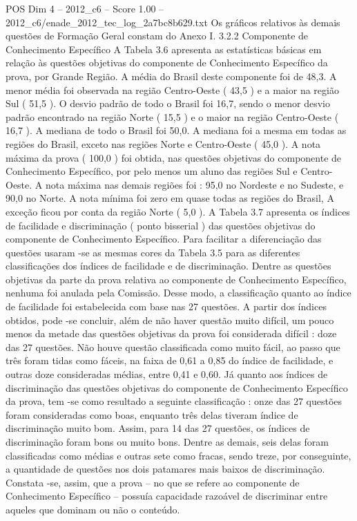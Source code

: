 \begin{textsample}{POS Dim 4 – 2012\_c6 – Score 1.00 – 2012\_c6/enade\_2012\_tec\_log\_2a7bc8b629.txt}
Os gráficos relativos às demais questões de Formação Geral constam do Anexo I. 3.2.2 Componente de Conhecimento Específico A Tabela 3.6 apresenta as estatísticas básicas em relação às questões objetivas do componente de Conhecimento Específico da prova, por Grande Região.
A média do Brasil deste componente foi de 48,3.
A menor média foi observada na região Centro-Oeste ( 43,5 ) e a maior na região Sul ( 51,5 ).
O desvio padrão de todo o Brasil foi 16,7, sendo o menor desvio padrão encontrado na região Norte ( 15,5 ) e o maior na região Centro-Oeste ( 16,7 ).
A mediana de todo o Brasil foi 50,0.
A mediana foi a mesma em todas as regiões do Brasil, exceto nas regiões Norte e Centro-Oeste ( 45,0 ).
A nota máxima da prova ( 100,0 ) foi obtida, nas questões objetivas do componente de Conhecimento Específico, por pelo menos um aluno das regiões Sul e Centro-Oeste.
A nota máxima nas demais regiões foi : 95,0 no Nordeste e no Sudeste, e 90,0 no Norte.
A nota mínima foi zero em quase todas as regiões do Brasil, A exceção ficou por conta da região Norte ( 5,0 ).
A Tabela 3.7 apresenta os índices de facilidade e discriminação ( ponto bisserial ) das questões objetivas do componente de Conhecimento Específico.
Para facilitar a diferenciação das questões usaram -se as mesmas cores da Tabela 3.5 para as diferentes classificações dos índices de facilidade e de discriminação.
Dentre as questões objetivas da parte da prova relativa ao componente de Conhecimento Específico, nenhuma foi anulada pela Comissão.
Desse modo, a classificação quanto ao índice de facilidade foi estabelecida com base nas 27 questões.
A partir dos índices obtidos, pode -se concluir, além de não haver questão muito difícil, um pouco menos da metade das questões objetivas da prova foi considerada difícil : doze das 27 questões.
Não houve questão classificada como muito fácil, ao passo que três foram tidas como fáceis, na faixa de 0,61 a 0,85 do índice de facilidade, e outras doze consideradas médias, entre 0,41 e 0,60.
Já quanto aos índices de discriminação das questões objetivas do componente de Conhecimento Específico da prova, tem -se como resultado a seguinte classificação : onze das 27 questões foram consideradas como boas, enquanto três delas tiveram índice de discriminação muito bom.
Assim, para 14 das 27 questões, os índices de discriminação foram bons ou muito bons.
Dentre as demais, seis delas foram classificadas como médias e outras sete como fracas, sendo treze, por conseguinte, a quantidade de questões nos dois patamares mais baixos de discriminação.
Constata -se, assim, que a prova – no que se refere ao componente de Conhecimento Específico – possuía capacidade razoável de discriminar entre aqueles que dominam ou não o conteúdo.

\end{textsample}
